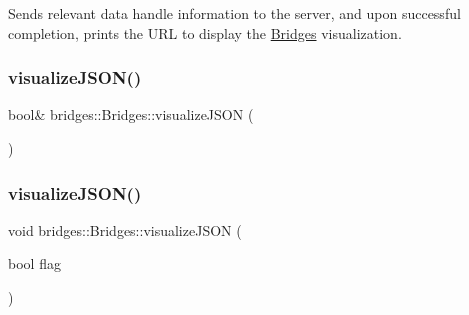 Sends relevant data handle information to the server, and upon successful completion, prints the U\+RL to display the \mbox{\hyperlink{namespacebridges_1_1_bridges}{Bridges}} visualization. \mbox{\label{namespacebridges_1_1_bridges_a692124feb006d58c277db36c2e9342c8}} 
\subsubsection{\texorpdfstring{visualize\+J\+S\+O\+N()}{visualizeJSON()}\hspace{0.1cm}{\footnotesize\ttfamily [1/2]}}
{\footnotesize\ttfamily bool\& bridges\+::\+Bridges\+::visualize\+J\+S\+ON (\begin{DoxyParamCaption}{ }\end{DoxyParamCaption})}

\mbox{\label{namespacebridges_1_1_bridges_abb0f749a6dbcd0a430504f66de1dbe64}} 
\subsubsection{\texorpdfstring{visualize\+J\+S\+O\+N()}{visualizeJSON()}\hspace{0.1cm}{\footnotesize\ttfamily [2/2]}}
{\footnotesize\ttfamily void bridges\+::\+Bridges\+::visualize\+J\+S\+ON (\begin{DoxyParamCaption}\item[{bool}]{flag }\end{DoxyParamCaption})}

